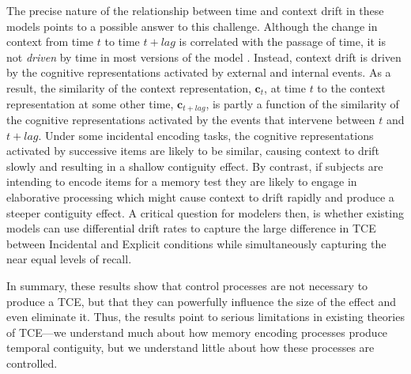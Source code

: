 \documentclass[man,natbib,floatsintext]{apa6} %
\begin{document}
The precise nature of the relationship between time and context drift in these models points to a possible answer to this challenge. Although the change in context from time $t$ to time $t+lag$ is correlated with the passage of time, it is not \emph{driven} by time in most versions of the model \citep[but see][for a model in which drift is driven by time]{HowaEtal14a}. Instead, context drift is driven by the cognitive representations activated by external and internal events. As a result, the similarity of the context representation, $\mathbf{c}_t$, at time $t$ to the context representation at some other time, $\mathbf{c}_{t+lag}$, is partly a function of the similarity of the cognitive representations activated by the events that intervene between $t$ and $t+lag$. Under some incidental encoding tasks, the cognitive representations activated by successive items are likely to be similar, causing context to drift slowly and resulting in a shallow contiguity effect. By contrast, if subjects are intending to encode items for a memory test they are likely to engage in elaborative processing which might cause context to drift rapidly and produce a steeper contiguity effect. A critical question for modelers then, is whether existing models can use differential drift rates to capture the large difference in TCE between Incidental and Explicit conditions while simultaneously capturing the near equal levels of recall.

In summary, these results show that control processes are not necessary to produce a TCE, but that they can powerfully influence the size of the effect and even eliminate it. Thus, the results point to serious limitations in existing theories of TCE---we understand much about how memory encoding processes produce temporal contiguity, but we understand little about how these processes are controlled.


\end{document}
